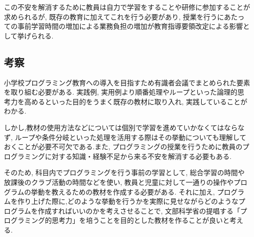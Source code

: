 この不安を解消するために教員は自力で学習をすることや研修に参加することが求められるが, 既存の教育に加えてこれを行う必要があり, 授業を行うにあたっての事前学習時間の増加による業務負担の増加が教育指導要領改定による影響として挙げられる.

\subsection{考察}
小学校プログラミング教育への導入を目指すため有識者会議でまとめられた要素を取り組む必要がある. 実践例, 実用例より順番処理やループといった論理的思考力を高めるといった目的をうまく既存の教材に取り入れ, 実践していることがわかる. 

しかし,教材の使用方法などについては個別で学習を進めていかなくてはならなず, ループや条件分岐といった処理を活用する際はその挙動についても理解しておくことが必要不可欠である.また, プログラミングの授業を行うために教員のプログラミングに対する知識・経験不足から来る不安を解消する必要もある. 

そのため, 科目内でプログラミングを行う事前の学習として, 総合学習の時間や放課後のクラブ活動の時間などを使い, 教員と児童に対して一通りの操作やプログラムの挙動を教えるための教材を作成する必要がある. それに加え, プログラムを作り上げた際に,どのような挙動を行うかを実際に見せながらどのようなプログラムを作成すればいいのかを考えさせることで, 文部科学省の提唱する「プログラミング的思考力」を培うことを目的とした教材を作ることが良いと考える.




